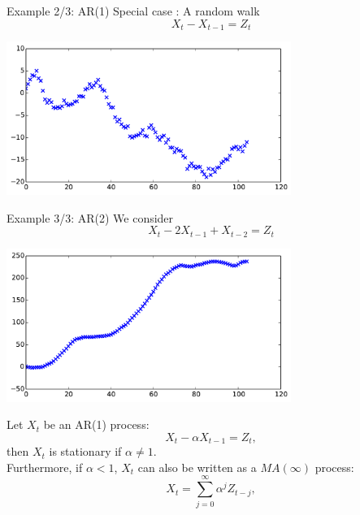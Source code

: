 \documentclass{beamer}
\begin{document}
\begin{frame}{}
\begin{exampleblock}{Example 2/3: AR(1)}
Special case : A random walk
\begin{equation*}
 X_t - X_{t-1} = Z_{t} 
\end{equation*}
\end{exampleblock}
\begin{center}
\includegraphics[height=5cm]{figures/1_ar1}
\end{center}
\end{frame}


\begin{frame}{}
\begin{exampleblock}{Example 3/3: AR(2)}
We consider
\begin{equation*}
 X_t - 2 X_{t-1} + X_{t-2} = Z_{t} 
\end{equation*}
\end{exampleblock}
\begin{center}
\includegraphics[height=5cm]{figures/1_ar2}
\end{center}
\end{frame}

\begin{frame}{}
Let $X_t$ be an AR(1) process:
\begin{equation*}
 X_t - \alpha X_{t-1} = Z_{t}, 
\end{equation*}
then $X_t$ is stationary if $\alpha \neq 1$.\\
\vspace{5mm}
Furthermore, if $\alpha < 1$, $X_t$ can also be written as a $MA(\infty)$ process:
\begin{equation*}
 X_t = \sum_{j=0}^\infty \alpha^j Z_{t-j}, 
\end{equation*}
\end{frame}
\end{document}
